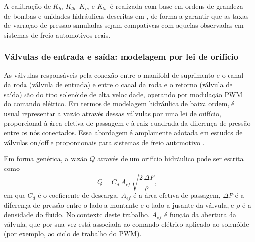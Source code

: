 A calibração de $K_b$, $K_{lb}$, $K_{ls}$ e $K_{lw}$ é realizada com base em ordens de grandeza de bombas e unidades hidráulicas descritas em , de forma a garantir que as taxas de variação de pressão simuladas sejam compatíveis com aquelas observadas em sistemas de freio automotivos reais.

\subsubsection{Válvulas de entrada e saída: modelagem por lei de orifício}
\label{sec:controle-valvulas-orificio}

As válvulas responsáveis pela conexão entre o manifold de suprimento e o canal da roda (válvula de entrada) e entre o canal da roda e o retorno (válvula de saída) são do tipo solenóide de alta velocidade, operando por modulação PWM do comando elétrico. Em termos de modelagem hidráulica de baixa ordem, é usual representar a vazão através dessas válvulas por uma lei de orifício, proporcional à área efetiva de passagem e à raiz quadrada da diferença de pressão entre os nós conectados. Essa abordagem é amplamente adotada em estudos de válvulas on/off e proporcionais para sistemas de freio automotivo \cite{ProportionalPressureABS2023,Lv2014,ChenLv2017,PressureCoordinatedControl2023}.

Em forma genérica, a vazão $Q$ através de um orifício hidráulico pode ser escrita como
\begin{equation}
    Q = C_d\,A_{ef}\,\sqrt{\frac{2\,\Delta P}{\rho}},
    \label{eq:controle-lei-orificio-geral}
\end{equation}
em que $C_d$ é o coeficiente de descarga, $A_{ef}$ é a área efetiva de passagem, $\Delta P$ é a diferença de pressão entre o lado a montante e o lado a jusante da válvula, e $\rho$ é a densidade do fluido. No contexto deste trabalho, $A_{ef}$ é função da abertura da válvula, que por sua vez está associada ao comando elétrico aplicado ao solenóide (por exemplo, ao ciclo de trabalho do PWM).

